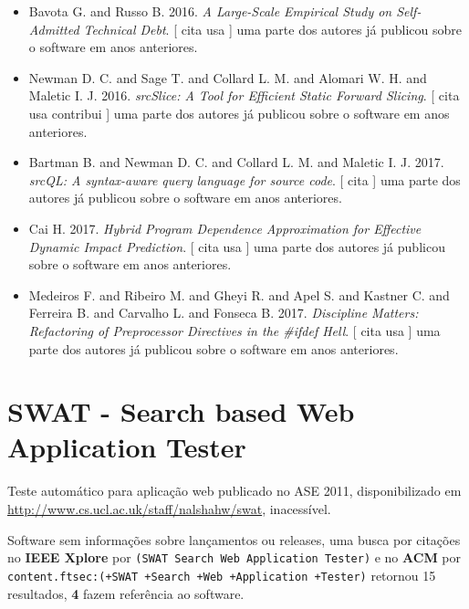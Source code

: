 \begin{itemize}
      [
          cita
          usa
      ]
uma parte dos autores já publicou sobre o software em anos anteriores.
\item Bavota G. and Russo B.
      2016.
        \textit{ A Large-Scale Empirical Study on Self-Admitted Technical Debt}.
      [
          cita
          usa
      ]
uma parte dos autores já publicou sobre o software em anos anteriores.
\item Newman D. C. and Sage T. and Collard L. M. and Alomari W. H. and Maletic I. J.
      2016.
        \textit{ srcSlice: A Tool for Efficient Static Forward Slicing}.
      [
          cita
          usa
          contribui
      ]
uma parte dos autores já publicou sobre o software em anos anteriores.
\item Bartman B. and Newman D. C. and Collard L. M. and Maletic I. J.
      2017.
        \textit{ srcQL: A syntax-aware query language for source code}.
      [
          cita
      ]
uma parte dos autores já publicou sobre o software em anos anteriores.
\item Cai H.
      2017.
        \textit{ Hybrid Program Dependence Approximation for Effective Dynamic Impact Prediction}.
      [
          cita
          usa
      ]
uma parte dos autores já publicou sobre o software em anos anteriores.
\item Medeiros F. and Ribeiro M. and Gheyi R. and Apel S. and Kastner C. and Ferreira B. and Carvalho L. and Fonseca B.
      2017.
        \textit{ Discipline Matters: Refactoring of Preprocessor Directives in the \#ifdef Hell}.
      [
          cita
          usa
      ]
uma parte dos autores já publicou sobre o software em anos anteriores.
\end{itemize}
\section{SWAT - Search based Web Application Tester}

Teste automático para aplicação web
publicado no ASE 2011,
disponibilizado em \url{http://www.cs.ucl.ac.uk/staff/nalshahw/swat},
inacessível.

Software sem informações sobre lançamentos ou releases,
uma busca por citações no {\bf IEEE Xplore} por
\texttt{(SWAT Search Web Application Tester)}
e no {\bf ACM} por
\texttt{content.ftsec:(+SWAT +Search +Web +Application +Tester)}
retornou
15 resultados,
{\bf 4} fazem referência ao software.


